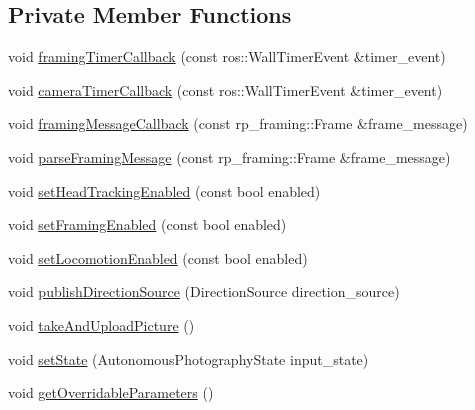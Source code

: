 \subsection*{\-Private \-Member \-Functions}
\begin{DoxyCompactItemize}
\item 
void \hyperlink{class_r_p_autonomous_photography_node_a8ca022430e1044128fd0a322a87f26d5}{framing\-Timer\-Callback} (const ros\-::\-Wall\-Timer\-Event \&timer\-\_\-event)
\item 
void \hyperlink{class_r_p_autonomous_photography_node_aec82a219088e613768e554f5f9732a73}{camera\-Timer\-Callback} (const ros\-::\-Wall\-Timer\-Event \&timer\-\_\-event)
\item 
void \hyperlink{class_r_p_autonomous_photography_node_aadd2a37eb8aafe4e6d3226f30f3dddb1}{framing\-Message\-Callback} (const rp\-\_\-framing\-::\-Frame \&frame\-\_\-message)
\item 
void \hyperlink{class_r_p_autonomous_photography_node_a6eb4620cfa451bf91407481bf5898978}{parse\-Framing\-Message} (const rp\-\_\-framing\-::\-Frame \&frame\-\_\-message)
\item 
void \hyperlink{class_r_p_autonomous_photography_node_a913f389a2689328a124b48cf76e7957b}{set\-Head\-Tracking\-Enabled} (const bool enabled)
\item 
void \hyperlink{class_r_p_autonomous_photography_node_a034a1abdb7ee3db392765daf1a02fe9f}{set\-Framing\-Enabled} (const bool enabled)
\item 
void \hyperlink{class_r_p_autonomous_photography_node_a1f23e163e120a22fba06df8c33f65c82}{set\-Locomotion\-Enabled} (const bool enabled)
\item 
void \hyperlink{class_r_p_autonomous_photography_node_aa34587f086d366945e448e44d8777a15}{publish\-Direction\-Source} (\-Direction\-Source direction\-\_\-source)
\item 
void \hyperlink{class_r_p_autonomous_photography_node_a843101a891a0e7cb94cc21caa1b505bc}{take\-And\-Upload\-Picture} ()
\item 
void \hyperlink{class_r_p_autonomous_photography_node_a8226e74139900fa61dbb7181f5f5a932}{set\-State} (\-Autonomous\-Photography\-State input\-\_\-state)
\item 
void \hyperlink{class_r_p_autonomous_photography_node_a2d6df6e8820b5a587967adffb1a9be6e}{get\-Overridable\-Parameters} ()
\end{DoxyCompactItemize}
